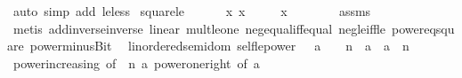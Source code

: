 \begin{isabellebody}
\ {\isacharparenleft}{\kern0pt}auto\ simp\ add{\isacharcolon}{\kern0pt}\ le{\isacharunderscore}{\kern0pt}less{\isacharparenright}{\kern0pt}%
\endisatagproof
{\isafoldproof}%
%
\isadelimproof
\isanewline
%
\endisadelimproof
\isanewline
{}\isamarkupfalse%
\ square{\isacharunderscore}{\kern0pt}le{\isacharunderscore}{\kern0pt}{}{\isacharcolon}{\kern0pt}\isanewline
\ \ \ {\isachardoublequoteopen}{\isacharminus}{\kern0pt}\ {}\ {\isasymle}\ x{\isachardoublequoteclose}\ {\isachardoublequoteopen}x\ {\isasymle}\ {}{\isachardoublequoteclose}\isanewline
\ \ \ {\isachardoublequoteopen}x\ {\isasymle}\ {}{\isachardoublequoteclose}\isanewline
%
\isadelimproof
\ \ \ \ %
\endisadelimproof
%
\isatagproof
{}\isamarkupfalse%
\ assms\isanewline
\ \ \ \ \isamarkupfalse%
\ {\isacharparenleft}{\kern0pt}metis\ add{\isachardot}{\kern0pt}inverse{\isacharunderscore}{\kern0pt}inverse\ linear\ mult{\isacharunderscore}{\kern0pt}le{\isacharunderscore}{\kern0pt}one\ neg{\isacharunderscore}{\kern0pt}equal{\isacharunderscore}{\kern0pt}{}{\isacharunderscore}{\kern0pt}iff{\isacharunderscore}{\kern0pt}equal\ neg{\isacharunderscore}{\kern0pt}le{\isacharunderscore}{\kern0pt}iff{\isacharunderscore}{\kern0pt}le\ power{}{\isacharunderscore}{\kern0pt}eq{\isacharunderscore}{\kern0pt}square\ power{\isacharunderscore}{\kern0pt}minus{\isacharunderscore}{\kern0pt}Bit{}{\isacharparenright}{\kern0pt}%
\endisatagproof
{\isafoldproof}%
%
\isadelimproof
\isanewline
%
\endisadelimproof
\isanewline
{}\isamarkupfalse%
%
\isadelimdocument
%
\endisadelimdocument
%
\isatagdocument
%
\isamarkuptrue%
%
\endisatagdocument
{\isafolddocument}%
%
\isadelimdocument
%
\endisadelimdocument
{}\isamarkupfalse%
\ {\isacharparenleft}{\kern0pt}\ linordered{\isacharunderscore}{\kern0pt}semidom{\isacharparenright}{\kern0pt}\ self{\isacharunderscore}{\kern0pt}le{\isacharunderscore}{\kern0pt}power{\isacharcolon}{\kern0pt}\ {\isachardoublequoteopen}{}\ {\isasymle}\ a\ {\isasymLongrightarrow}\ {}\ {\isacharless}{\kern0pt}\ n\ {\isasymLongrightarrow}\ a\ {\isasymle}\ a\ {\isacharcircum}{\kern0pt}\ n{\isachardoublequoteclose}\isanewline
%
\isadelimproof
\ \ %
\endisadelimproof
%
\isatagproof
{}\isamarkupfalse%
\ power{\isacharunderscore}{\kern0pt}increasing\ {\isacharbrackleft}{\kern0pt}of\ {}\ n\ a{\isacharbrackright}{\kern0pt}\ power{\isacharunderscore}{\kern0pt}one{\isacharunderscore}{\kern0pt}right\ {\isacharbrackleft}{\kern0pt}of\ a{\isacharbrackright}{\kern0pt}\ \isamarkupfalse%

\end{isabellebody}
